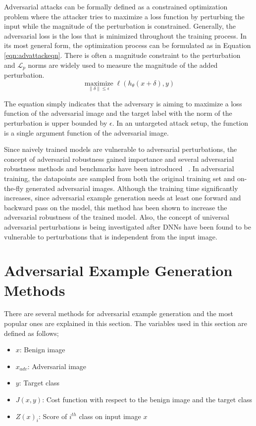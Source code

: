 Adversarial attacks can be formally defined as a constrained optimization problem where the attacker tries to maximize a loss function by perturbing the input while the magnitude of the perturbation is constrained. Generally, the adversarial loss is the loss that is minimized throughout the training process. In its most general form, the optimization process can be formulated as in Equation \ref{eqn:advattackeqn}. There is often a magnitude constraint to the perturbation and \(\mathcal{L}_p\) norms are widely used to measure the magnitude of the added perturbation.
\begin{equation}
    \label{eqn:advattackeqn}
    \underset{\|\delta\| \leq \epsilon}{\operatorname{maximize}} \ell\left(h_{\theta}(x+\delta), y\right)
\end{equation}

The equation simply indicates that the adversary is aiming to maximize a loss function of the adversarial image and the target label with the norm of the perturbation is upper bounded by \(\epsilon\). In an untargeted attack setup, the function is a single argument function of the adversarial image.

Since naively trained models are vulnerable to adversarial perturbations, the concept of adversarial robustness gained importance and several adversarial robustness methods and benchmarks have been introduced ~\cite{madry2017towards,shafahi2019adversarial,shafahi2018adversarial,tramer2017ensemble,ross2018improving}. In adversarial training, the datapoints are sampled from both the original training set and on-the-fly generated adversarial images. Although the training time significantly increases, since adversarial example generation needs at least one forward and backward pass on the model, this method has been shown to increase the adversarial robustness of the trained model. Also, the concept of universal adversarial perturbations is being investigated after DNNs have been found to be vulnerable to perturbations that is independent from the input image.~\cite{sen2021training}

\section{Adversarial Example Generation Methods}\label{section:methods}
There are several methods for adversarial example generation and the most popular ones are explained in this section. The variables used in this section are defined as follows;
\begin{itemize}
    \setlength\itemsep{0em}
    \item \(x\): Benign image
    \item \(x_{adv}\): Adversarial image
    \item \(y\): Target class
    \item \(J(x, y)\): Cost function with respect to the benign image and the target class
    \item \(Z(x)_i\): Score of $i^{th}$ class on input image \(x\)
\end{itemize}

